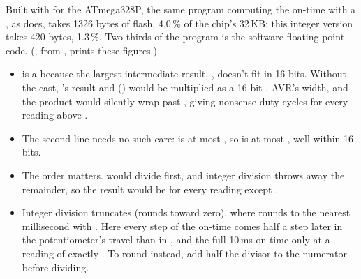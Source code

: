 \noindent Built with  for the ATmega328P, the same program computing the on-time
with a , as  does, takes 1326 bytes of flash, 4.0\,\% of the chip's
32\,KB; this integer version takes 420 bytes, 1.3\,\%. Two-thirds of the  program is
the software floating-point code. (, from
, prints these figures.)

\note
\begin{itemize}
  \item {} is a  because the largest intermediate result,
    , doesn't fit in 16 bits. Without the cast, 's
     result and  () would be multiplied as a 16-bit
    , AVR's  width, and the product would silently wrap past
    , giving nonsense duty cycles for every reading above .
  \item The second line needs no such care:  is at most , so
     is at most , well within 16 bits.
  \item The order matters.  would divide first, and integer
    division throws away the remainder, so the result would be  for every reading except
    .
  \item Integer division truncates (rounds toward zero), where  rounds to the
    nearest millisecond with . Here every step of the on-time comes half a step later
    in the potentiometer's travel than in , and the full 10\,ms on-time only at a
    reading of exactly . To round instead, add half the divisor to the numerator before
    dividing.
\end{itemize}

